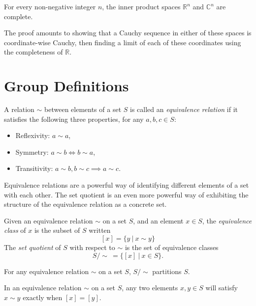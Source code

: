 \begin{prop}
	For every non-negative integer $n$, the inner product spaces $\mathbb{R}^n$ and $\mathbb{C}^n$ are complete.
\end{prop}
The proof amounts to showing that a Cauchy sequence in either of these spaces is coordinate-wise Cauchy, then finding a limit of each of these coordinates using the completeness of $\mathbb{R}$.

\section{Group Definitions}\label{group-defs}

\begin{define}
	A relation $\sim$ between elements of a set $S$ is called an \emph{equivalence relation} if it satisfies the following three properties, for any $a, b, c \in S$:
	\begin{itemize}
		\item Reflexivity: $a \sim a$,
		\item Symmetry: $a \sim b \iff b \sim a$,
		\item Transitivity: $a \sim b, b \sim c \implies a \sim c$.
	\end{itemize}
\end{define}

Equivalence relations are a powerful way of identifying different elements of a set with each other. The set quotient is an even more powerful way of exhibiting the structure of the equivalence relation as a concrete set.

\begin{define}
	Given an equivalence relation $\sim$ on a set $S$, and an element $x \in S$, the \emph{equivalence class} of $x$ is the subset of $S$ written
	\[[x] = \{y\ |\ x \sim y\}\]
	The \emph{set quotient} of $S$ with respect to $\sim$ is the set of equivalence classes
	\[S/\sim \ = \{[x]\ |\ x \in S\}.\]
\end{define}

\begin{prop}
	For any equivalence relation $\sim$ on a set $S$, $S/\sim$ partitions $S$.
\end{prop}

\begin{prop}
	In an equivalence relation $\sim$ on a set $S$, any two elements $x, y \in S$ will satisfy $x \sim y$ exactly when $[x] = [y]$.
\end{prop}


